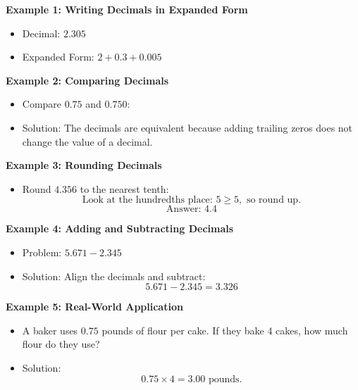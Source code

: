 \documentclass[12pt]{article}
\begin{document}
\vspace{1em}

\begin{tcolorbox}[colframe=black!60, colback=white, 
coltitle=black, colbacktitle=black!15, fonttitle=\bfseries\Large, 
title=Examples, halign title=center, left=10pt, right=10pt, top=10pt, bottom=15pt]
\textbf{Example 1: Writing Decimals in Expanded Form}
\begin{itemize}
    \item Decimal: \( 2.305 \)
    \item Expanded Form: \( 2 + 0.3 + 0.005 \)
\end{itemize}

\textbf{Example 2: Comparing Decimals}
\begin{itemize}
    \item Compare \( 0.75 \) and \( 0.750 \):
    \item Solution: The decimals are equivalent because adding trailing zeros does not change the value of a decimal.
\end{itemize}

\textbf{Example 3: Rounding Decimals}
\begin{itemize}
    \item Round \( 4.356 \) to the nearest tenth:
    \[ \text{Look at the hundredths place: } 5 \geq 5, \text{ so round up.} \]
    \[ \text{Answer: } 4.4 \]
\end{itemize}

\textbf{Example 4: Adding and Subtracting Decimals}
\begin{itemize}
    \item Problem: \( 5.671 - 2.345 \)
    \item Solution: Align the decimals and subtract:
    \[ 5.671 - 2.345 = 3.326 \]
\end{itemize}

\textbf{Example 5: Real-World Application}
\begin{itemize}
    \item A baker uses \( 0.75 \) pounds of flour per cake. If they bake 4 cakes, how much flour do they use?
    \item Solution:
    \[ 0.75 \times 4 = 3.00 \text{ pounds.} \]
\end{itemize}
\end{tcolorbox}

\vspace{1em}
\end{document}
